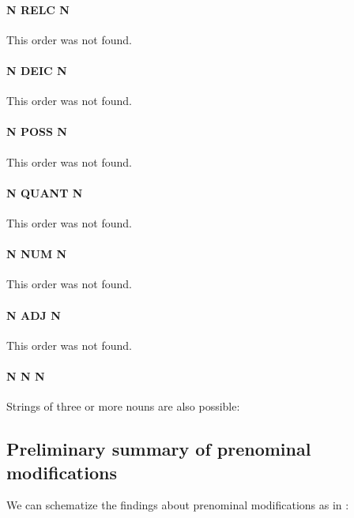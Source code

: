 \paragraph{N RELC  N}
This order was not found.
\paragraph{N DEIC N}
This order was not found.
\paragraph{N POSS N}
This order was not found.
\paragraph{N QUANT N}
This order was not found.
\paragraph{N NUM N}
This order was not found.
\paragraph{N ADJ N}
This order was not found.


\paragraph{N N N}
Strings of three or more nouns are also possible:


\subsection{Preliminary summary of prenominal modifications}\label{sec:nppp:Preliminarysummaryofprenominalmodifications}

We can schematize the findings about prenominal modifications as in :


